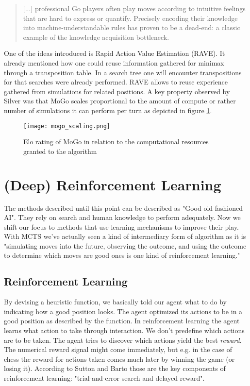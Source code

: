 \begin{quotation}
    [...] professional Go players often play moves according to intuitive feelings that are hard to express or quantify. Precisely encoding their knowledge into machine-understandable rules has proven to be a dead-end: a classic example of the knowledge acquisition bottleneck. \cite[p. 1873]{gelly_monte-carlo_2011}
\end{quotation}

One of the ideas introduced is Rapid Action Value Estimation (RAVE). It already mentioned how one could reuse information gathered for minimax through a transposition table. In a search tree one will encounter transpositions for that searches were already performed. RAVE allows to reuse experience gathered from simulations for related positions. A key property observed by Silver was that MoGo scales proportional to the amount of compute or rather number of simulations it can perform per turn as depicted in figure \ref{mogo_scaling}.

\begin{figure}
    \centering
    \texttt{[image: mogo\_scaling.png]}
    \caption{Elo rating of MoGo in relation to the computational resources granted to the algorithm \cite[p. 1872]{gelly_monte-carlo_2011}}
    \label{mogo_scaling}
\end{figure}

\section{(Deep) Reinforcement Learning}
The methods described until this point can be described as "Good old fashioned AI". They rely on search and human knowledge to perform adequately. Now we shift our focus to methods that use learning mechanisms to improve their play. With MCTS we've actually seen a kind of intermediary form of algorithm as it is "simulating moves into the future, observing the outcome, and using the outcome to determine which moves are good ones is one kind of reinforcement learning." \cite[p. 331]{russell_artificial_2021}

\subsection{Reinforcement Learning}
By devising a heuristic function, we basically told our agent what to do by indicating how a good position looks. The agent optimized its actions to be in a good position as described by the function. In reinforcement learning the agent learns what action to take through interaction. We don't predefine which actions are to be taken. The agent tries to discover which actions yield the best \textit{reward}. The numerical reward signal might come immediately, but e.g. in the case of chess the reward for actions taken comes much later by winning the game (or losing it). According to Sutton and Barto those are the key components of reinforcement learning: "trial-and-error search and delayed reward". \cite[p. 1]{sutton_reinforcement_2018}

